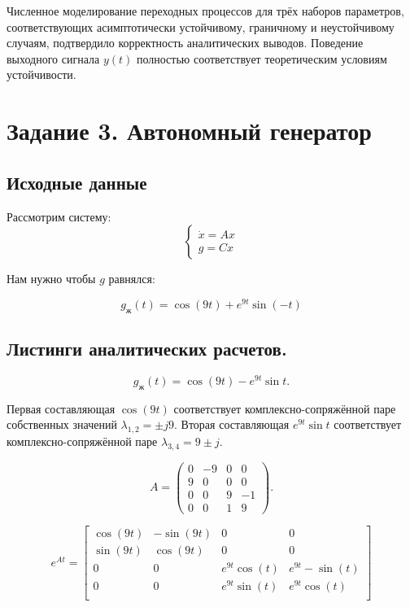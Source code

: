 \documentclass[a5paper, 10pt]{article}
\theoremstyle{definition}
\theoremstyle{plain}
\theoremstyle{remark}
\begin{document}
Численное моделирование переходных процессов для трёх наборов параметров, соответствующих асимптотически устойчивому, граничному и неустойчивому случаям, подтвердило корректность аналитических выводов. Поведение выходного сигнала $y(t)$ полностью соответствует теоретическим условиям устойчивости.

\section{Задание 3. Автономный генератор}

\subsection{Исходные данные}

Рассмотрим систему:
$$
\begin{cases}
    \dot{x}=Ax\\
    g=Cx
\end{cases}
$$

Нам нужно чтобы $g$ равнялся:

$$g_{\text{ж}}(t)=\cos(9t)+e^{9t}\sin(-t)$$

\subsection{Листинги аналитических расчетов.}

$$
g_{\text{ж}}(t) = \cos(9t) - e^{9t}\sin t.
$$

Первая составляющая $\cos(9t)$ соответствует комплексно-сопряжённой паре собственных значений $\lambda_{1,2} = \pm j9$. Вторая составляющая $e^{9t}\sin t$ соответствует комплексно-сопряжённой паре $\lambda_{3,4} = 9 \pm j$.

$$A = \begin{pmatrix} 
0 & -9 & 0 & 0 \\
9 & 0 & 0 & 0 \\
0 & 0 & 9 & -1 \\
0 & 0 & 1 & 9 
\end{pmatrix}. $$

$$
e^{At}=\begin{bmatrix}
    \cos(9t)&-\sin(9t)&0&0\\
    \sin(9t)&\cos(9t)&0&0\\
    0 & 0 & e^{9t}\cos(t) & e^{9t}-\sin(t) \\
    0 & 0 & e^{9t}\sin(t) & e^{9t}\cos(t) \\
\end{bmatrix}
$$
\end{document}
